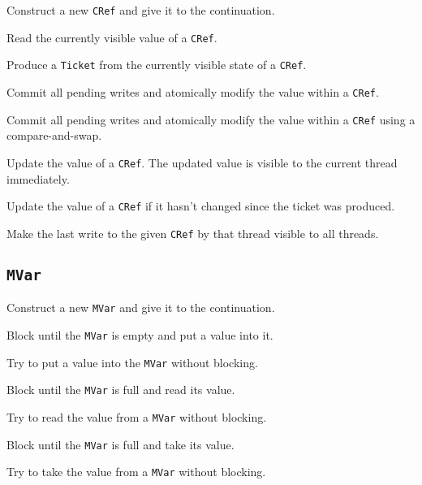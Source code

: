 \begin{description}
  Construct a new \verb|CRef| and give it to the continuation.

  Read the currently visible value of a \verb|CRef|.

  Produce a \verb|Ticket| from the currently visible state of a
  \verb|CRef|.

  Commit all pending writes and atomically modify the value within a
  \verb|CRef|.

  Commit all pending writes and atomically modify the value within a
  \verb|CRef| using a compare-and-swap.

  Update the value of a \verb|CRef|.  The updated value is visible to the
  current thread immediately.

  Update the value of a \verb|CRef| if it hasn't changed since the ticket
  was produced.

  Make the last write to the given \verb|CRef| by that thread visible to all
  threads.
\end{description}

\subsection{\texttt{MVar}}

\begin{description}
  Construct a new \verb|MVar| and give it to the continuation.

  Block until the \verb|MVar| is empty and put a value into it.

  Try to put a value into the \verb|MVar| without blocking.

  Block until the \verb|MVar| is full and read its value.

  Try to read the value from a \verb|MVar| without blocking.

  Block until the \verb|MVar| is full and take its value.

  Try to take the value from a \verb|MVar| without blocking.
\end{description}


